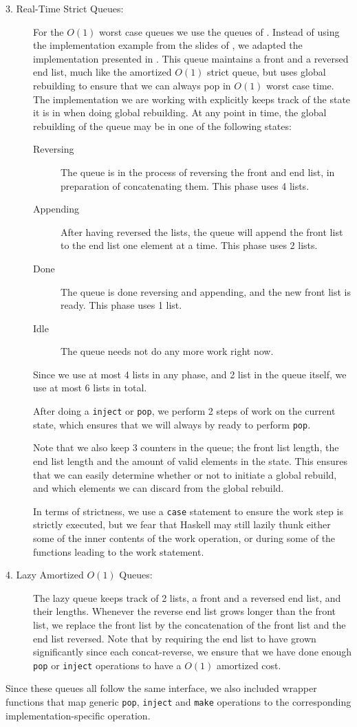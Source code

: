 \begin{description}
\item[3. Real-Time Strict Queues:] 
For the $O(1)$ worst case queues we use the queues of \citep{melville}. Instead of using the implementation example from the slides of \citep{gerth}, we adapted the implementation presented in \citep{okasaki}. This queue maintains a front and a reversed end list, much like the amortized $O(1)$ strict queue, but uses global rebuilding to ensure that we can always pop in $O(1)$ worst case time. The implementation we are working with explicitly keeps track of the state it is in when doing global rebuilding. At any point in time, the global rebuilding of the queue may be in one of the following states:
\begin{description}
\item[Reversing] The queue is in the process of reversing the front and end list, in preparation of concatenating them. This phase uses 4 lists.
\item[Appending] After having reversed the lists, the queue will append the front list to the end list one element at a time. This phase uses 2 lists.
\item[Done] The queue is done reversing and appending, and the new front list is ready. This phase uses 1 list.
\item[Idle] The queue needs not do any more work right now.
\end{description}

Since we use at most 4 lists in any phase, and 2 list in the queue itself, we use at most 6 lists in total.

After doing a \texttt{inject} or \texttt{pop}, we perform 2 steps of work on the current state, which ensures that we will always by ready to perform \texttt{pop}.

Note that we also keep 3 counters in the queue; the front list length, the end list length and the amount of valid elements in the state. This ensures that we can easily determine whether or not to initiate a global rebuild, and which elements we can discard from the global rebuild.

In terms of strictness, we use a \texttt{case} statement to ensure the work step is strictly executed, but we fear that Haskell may still lazily thunk either some of the inner contents of the work operation, or during some of the functions leading to the work statement.

\item[4. Lazy Amortized $O(1)$ Queues:]

The lazy queue keeps track of 2 lists, a front and a reversed end list, and their lengths. Whenever the reverse end list grows longer than the front list, we replace the front list by the concatenation of the front list and the end list reversed. 
Note that by requiring the end list to have grown significantly since each concat-reverse, we ensure that we have done enough \texttt{pop} or \texttt{inject} operations to have a $O(1)$ amortized cost.

\end{description}

Since these queues all follow the same interface, we also included wrapper functions that map generic \texttt{pop}, \texttt{inject} and \texttt{make} operations to the corresponding implementation-specific operation.